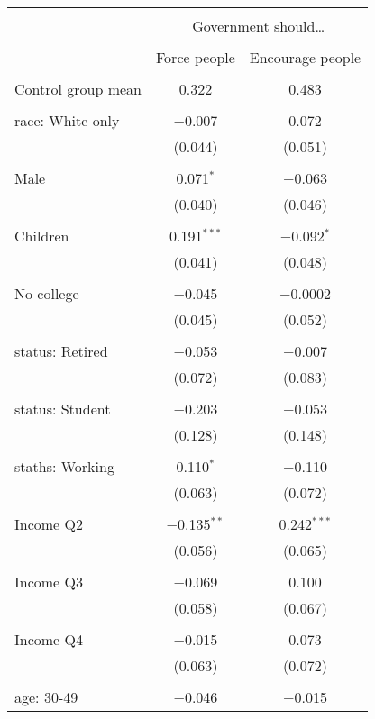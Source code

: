 
\begin{tabular}{@{\extracolsep{5pt}}lcc} 
\\[-1.8ex]\hline 
\hline \\[-1.8ex] 
 & \multicolumn{2}{c}{Government should…} \\ 
\cline{2-3} 
\\[-1.8ex] & Force people & Encourage people \\ 
\hline \\[-1.8ex] 
 Control group mean & 0.322 & 0.483  \\ \hline \\[-1.8ex] race: White only & $-$0.007 & 0.072 \\ 
  & (0.044) & (0.051) \\ 
  & & \\ 
 Male & 0.071$^{*}$ & $-$0.063 \\ 
  & (0.040) & (0.046) \\ 
  & & \\ 
 Children & 0.191$^{***}$ & $-$0.092$^{*}$ \\ 
  & (0.041) & (0.048) \\ 
  & & \\ 
 No college & $-$0.045 & $-$0.0002 \\ 
  & (0.045) & (0.052) \\ 
  & & \\ 
 status: Retired & $-$0.053 & $-$0.007 \\ 
  & (0.072) & (0.083) \\ 
  & & \\ 
 status: Student & $-$0.203 & $-$0.053 \\ 
  & (0.128) & (0.148) \\ 
  & & \\ 
 staths: Working & 0.110$^{*}$ & $-$0.110 \\ 
  & (0.063) & (0.072) \\ 
  & & \\ 
 Income Q2 & $-$0.135$^{**}$ & 0.242$^{***}$ \\ 
  & (0.056) & (0.065) \\ 
  & & \\ 
 Income Q3 & $-$0.069 & 0.100 \\ 
  & (0.058) & (0.067) \\ 
  & & \\ 
 Income Q4 & $-$0.015 & 0.073 \\ 
  & (0.063) & (0.072) \\ 
  & & \\ 
 age: 30-49 & $-$0.046 & $-$0.015 \\ 

\end{tabular}
